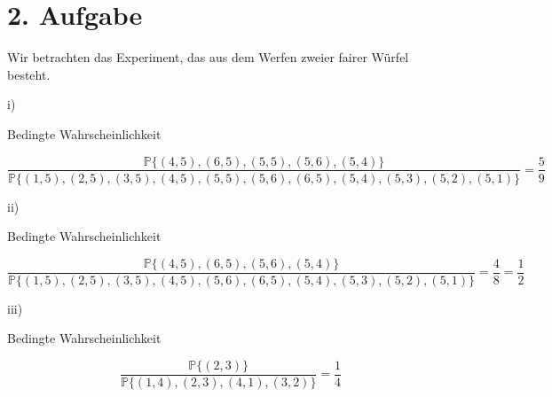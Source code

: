 \documentclass[10pt,a4paper,parskip=half]{scrartcl}
\begin{document}
\section*{2. Aufgabe}
Wir betrachten das Experiment, das aus dem Werfen zweier fairer Würfel besteht.
\begin{flushleft}
\item[i)]
\begin{description}
Bedingte Wahrscheinlichkeit
\end{description}
\end{flushleft}
\begin{displaymath}
  \frac{ \mathbb{P} \{(4,5),(6,5),(5,5),(5,6),(5,4)\}}{\mathbb{P} \{(1,5),(2,5),(3,5),(4,5),(5,5),(5,6),(6,5),(5,4),(5,3),(5,2),(5,1)\}} = \frac{5}{9}
\end{displaymath}
\begin{flushleft}
\item[ii)]
\begin{description}
Bedingte Wahrscheinlichkeit
\end{description}
\end{flushleft}
\begin{displaymath}
	\frac{ \mathbb{P} \{(4,5),(6,5),(5,6),(5,4)\}}{\mathbb{P} \{(1,5),(2,5),(3,5),(4,5),(5,6),(6,5),(5,4),(5,3),(5,2),(5,1)\}} = \frac{4}{8} = \frac{1}{2}
\end{displaymath}
\begin{flushleft}
\item[iii)]
\begin{description}
Bedingte Wahrscheinlichkeit
\end{description}
\end{flushleft}
\begin{displaymath}
	\frac{ \mathbb{P} \{(2,3)\}}{\mathbb{P} \{(1,4),(2,3),(4,1),(3,2)\}} = \frac{1}{4}
\end{displaymath}
\end{document}
